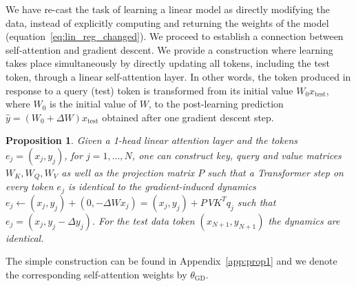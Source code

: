 \documentclass{article}
\newtheorem{prop}{Proposition}
\def\eqref#1{equation~\ref{#1}}
\theoremstyle{plain}
\theoremstyle{definition}
\theoremstyle{remark}
\begin{document}
We have re-cast the task of learning a linear model as directly modifying the data, instead of explicitly computing and returning the weights of the model (\eqref{eq:lin_reg_changed}). We proceed to establish a connection between self-attention and gradient descent. We provide a construction where learning takes place simultaneously by directly updating all tokens, including the test token, through a linear self-attention layer. In other words, the token produced in response to a query (test) token is transformed from its initial value $W_0 x_{\text{test}}$, where $W_0$ is the initial value of $W$, to the post-learning prediction $\hat{y} = (W_0 + \Delta W) x_{\text{test}}$ obtained after one gradient descent step.

\begin{prop}
\label{prop:self_att_gd}
Given a 1-head linear attention layer and the tokens $e_j = (x_j, y_j)$, for $j=1,\ldots,N$, one can construct key, query and value matrices $W_K, W_Q, W_V$ as well as the projection matrix $P$ such that a Transformer step on every token $e_j$ is identical to the gradient-induced dynamics $ e_j \leftarrow (x_j, y_j) + (0, -\Delta W x_j) = (x_j, y_j) + P \,V K^{T}q_{j}$ such that $e_j = (x_j, y_j - \Delta y_j)$. For the test data token $(x_{N+1}, y_{N+1})$ the dynamics are identical.
\end{prop}
The simple construction can be found in Appendix~\ref{app:prop1} and we denote the corresponding self-attention weights by  $\theta_{\text{GD}}$.
\end{document}
